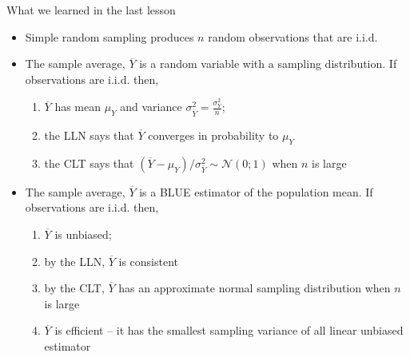 \documentclass[notes,10pt, aspectratio=169]{beamer}
\begin{document}
\begin{frame}{What we learned in the last lesson}
\begin{itemize}
    \item Simple random sampling produces $n$ random observations that are i.i.d.
    \item The sample average, $\overline{Y}$ is a random variable with a sampling distribution. If observations are i.i.d. then,
    \begin{enumerate}
        \item $\overline{Y}$ has mean $\mu_Y$ and variance $\sigma^2_{\overline{Y}} = \frac{\sigma^2_Y}{n} $;
        \item the LLN says that $\overline{Y}$ converges in probability to  $\mu_Y$
        \item the CLT says that $(\overline{Y}-\mu_Y)/\sigma^2_{\overline{Y}} \sim \mathcal{N}(0;1)$ when $n$ is large
    \end{enumerate}
      \item The sample average, $\overline{Y}$ is a BLUE estimator of the population mean. If observations are i.i.d. then,
    \begin{enumerate}
        \item $\overline{Y}$ is unbiased;
        \item by the LLN, $\overline{Y}$ is consistent
        \item by the CLT, $\overline{Y}$ has an approximate normal sampling distribution when $n$ is large
        \item $\overline{Y}$ is efficient -- it has the smallest sampling variance of all linear unbiased estimator
    \end{enumerate}
\end{itemize}
\end{frame}
\end{document}
